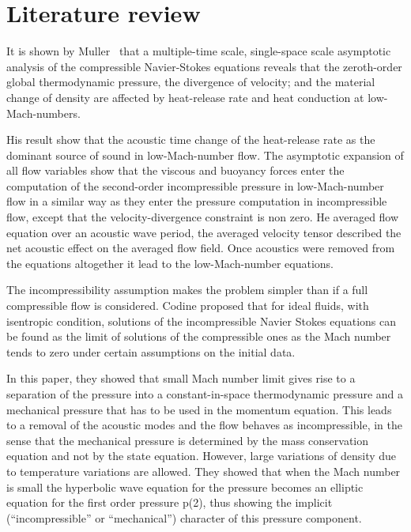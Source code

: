 \section{Literature review}

It is shown by Muller~\cite{Muller} that a multiple-time scale, single-space scale asymptotic analysis of the compressible Navier-Stokes equations reveals that the zeroth-order global thermodynamic pressure, the divergence of velocity; and the material change of density are affected by heat-release rate and heat conduction at low-Mach-numbers.

\bigskip 
\noindent His result show that the acoustic time change of the heat-release rate as the dominant source of sound in low-Mach-number flow. The asymptotic expansion of all flow variables show that the viscous and buoyancy forces enter the computation of the second-order incompressible pressure in low-Mach-number flow in a similar way as they enter the pressure computation in incompressible flow, except that the
velocity-divergence constraint is non zero. He averaged flow equation over an acoustic wave period, the averaged velocity tensor described the net acoustic effect on the averaged flow field. Once acoustics were removed from the equations altogether it lead to the low-Mach-number equations.

\bigskip
\noindent The incompressibility assumption makes the problem simpler than if a full compressible flow is considered. Codine\cite{Codina} proposed that for ideal fluids, with isentropic condition, solutions of the incompressible Navier Stokes equations can be found as the limit of solutions of the compressible ones as the Mach number tends to zero under certain assumptions on the initial data.

\noindent In this paper, they showed that small Mach number limit gives rise to a separation of the pressure into a constant-in-space thermodynamic pressure and a mechanical pressure that has to be used in the momentum equation. This leads to a removal of the acoustic modes and the flow behaves as incompressible, in the sense that the mechanical pressure is determined by the mass conservation
equation and not by the state equation. However, large variations of density
due to temperature variations are allowed. They showed that when the Mach number is small the hyperbolic wave equation for the pressure becomes an elliptic
equation for the first order pressure p(2), thus showing the implicit (“incompressible” or “mechanical”) character of this pressure component.


